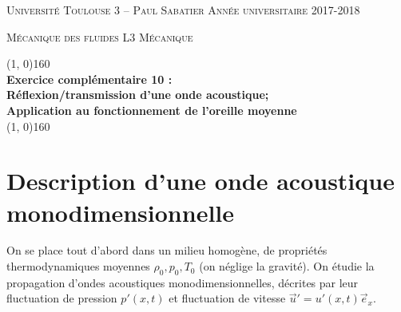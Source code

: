 \documentclass[10pt, a4paper]{article}
\renewcommand{\thickline}[2]{\linethickness{#1} \line(1, 0){#2}}
\begin{document}

\begin{center}

  \textsc{Université Toulouse 3 -- Paul Sabatier \hfill Année universitaire 2017-2018}
  
  \textsc{Mécanique des fluides \hfill L3 Mécanique}
  
  \vspace{0mm}
  
  \begin{center}
    \thickline{0.4mm}{160}
    \\ \vspace{3mm}
  \textbf{\large Exercice complémentaire 10 : 
  \\
  Réflexion/transmission d'une onde acoustique;  \\
  Application au fonctionnement de l'oreille moyenne}
    \\ %
    \thickline{0.4mm}{160}
  \end{center}

  
\end{center}

\section{Description d'une onde acoustique monodimensionnelle}

On se place tout d'abord dans un milieu homogène, de propriétés thermodynamiques moyennes 
$\rho_0,p_0,T_0$ (on néglige la gravité).
On étudie la propagation d'ondes acoustiques monodimensionnelles, décrites par leur fluctuation de pression $p'(x,t)$ et fluctuation de vitesse $\vec{u}' =  u'(x,t) \vec{e}_x$.
 
\end{document}
